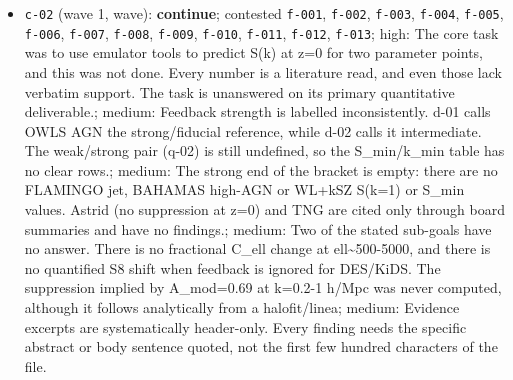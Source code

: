\documentclass[11pt,a4paper]{article}
\begin{document}
\begin{itemize}
  \item \texttt{c-02} (wave 1, wave): \textbf{continue}; contested \texttt{f-001}, \texttt{f-002}, \texttt{f-003}, \texttt{f-004}, \texttt{f-005}, \texttt{f-006}, \texttt{f-007}, \texttt{f-008}, \texttt{f-009}, \texttt{f-010}, \texttt{f-011}, \texttt{f-012}, \texttt{f-013}; high: The core task was to use emulator tools to predict S(k) at z=0 for two parameter points, and this was not done. Every number is a literature read, and even those lack verbatim support. The task is unanswered on its primary quantitative deliverable.; medium: Feedback strength is labelled inconsistently. d-01 calls OWLS AGN the strong/fiducial reference, while d-02 calls it intermediate. The weak/strong pair (q-02) is still undefined, so the S\_min/k\_min table has no clear rows.; medium: The strong end of the bracket is empty: there are no FLAMINGO jet, BAHAMAS high-AGN or WL+kSZ S(k=1) or S\_min values. Astrid (no suppression at z=0) and TNG are cited only through board summaries and have no findings.; medium: Two of the stated sub-goals have no answer. There is no fractional C\_ell change at ell\textasciitilde{}500-5000, and there is no quantified S8 shift when feedback is ignored for DES/KiDS. The suppression implied by A\_mod=0.69 at k=0.2-1 h/Mpc was never computed, although it follows analytically from a halofit/linea; medium: Evidence excerpts are systematically header-only. Every finding needs the specific abstract or body sentence quoted, not the first few hundred characters of the file.

\end{itemize}
\end{document}
